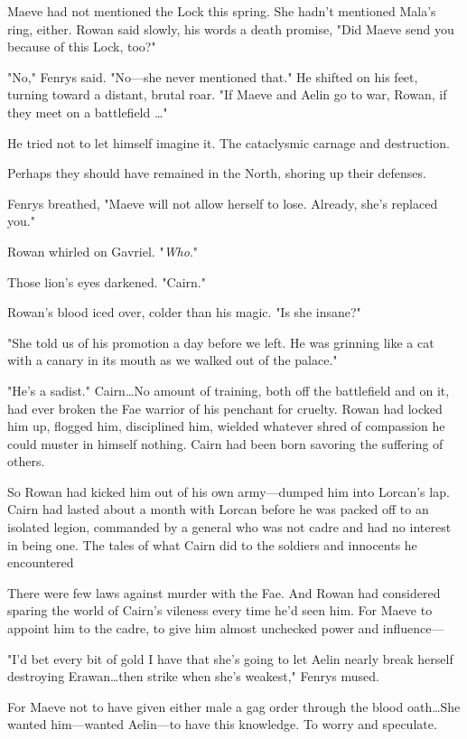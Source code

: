Maeve had not mentioned the Lock this spring.
She hadn't mentioned Mala's ring, either.
Rowan said slowly, his words a death promise, "Did Maeve send you because of this Lock, too?"

"No," Fenrys said.
"No---she never mentioned that."
He shifted on his feet, turning toward a distant, brutal roar.
"If Maeve and Aelin go to war, Rowan, if they meet on a battlefield \ldots"

He tried not to let himself imagine it.
The cataclysmic carnage and destruction.

Perhaps they should have remained in the North, shoring up their defenses.

Fenrys breathed, "Maeve will not allow herself to lose.
Already, she's replaced you."

Rowan whirled on Gavriel.
"\emph{Who}."

Those lion's eyes darkened.
"Cairn."

Rowan's blood iced over, colder than his magic.
"Is she insane?"

"She told us of his promotion a day before we left.
He was grinning like a cat with a canary in its mouth as we walked out of the palace."

"He's a sadist."
Cairn\ldots No amount of training, both off the battlefield and on it, had ever broken the Fae warrior of his penchant for cruelty.
Rowan had locked him up, flogged him, disciplined him, wielded whatever shred of compassion he could muster in himself 
nothing.
Cairn had been born savoring the suffering of others.

So Rowan had kicked him out of his own army---dumped him into Lorcan's lap.
Cairn had lasted about a month with Lorcan before he was packed off to an isolated legion, commanded by a general who was not cadre and had no interest in being one.
The tales of what Cairn did to the soldiers and innocents he encountered 

There were few laws against murder with the Fae.
And Rowan had considered sparing the world of Cairn's vileness every time he'd seen him.
For Maeve to appoint him to the cadre, to give him almost unchecked power and influence---

"I'd bet every bit of gold I have that she's going to let Aelin nearly break herself destroying Erawan\ldots then strike when she's weakest," Fenrys mused.

For Maeve not to have given either male a gag order through the blood oath\ldots She wanted him---wanted Aelin---to have this knowledge.
To worry and speculate.


